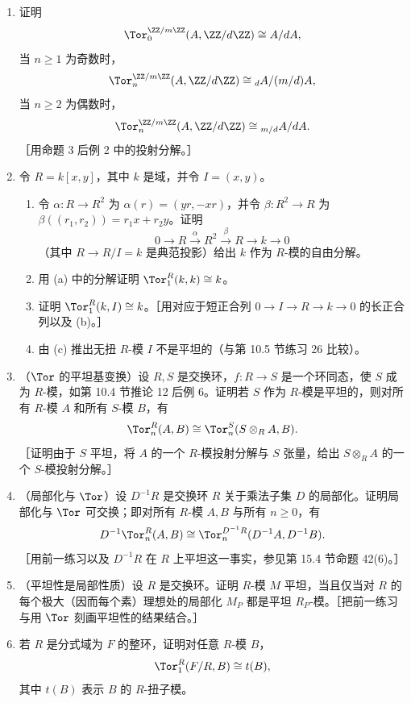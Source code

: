 \begin{enumerate}[label=\arabic*.]
  \item 证明
  \[
  \Tor_0^{\ZZ/m\ZZ}(A,\ZZ/d\ZZ)\cong A/dA,
  \]
  当 $n\geq1$ 为奇数时，
  \[
  \Tor_n^{\ZZ/m\ZZ}(A,\ZZ/d\ZZ)\cong {}_dA/(m/d)A,
  \]
  当 $n\geq2$ 为偶数时，
  \[
  \Tor_n^{\ZZ/m\ZZ}(A,\ZZ/d\ZZ)\cong {}_{m/d}A/dA.
  \]
  ［用命题 3 后例 2 中的投射分解。］

  \item 令 $R=k[x,y]$，其中 $k$ 是域，并令 $I=(x,y)$。
  \begin{enumerate}[label=(\alph*)]
    \item 令 $\alpha:R\to R^2$ 为 $\alpha(r)=(yr,-xr)$，并令 $\beta:R^2\to R$ 为 $\beta((r_1,r_2))=r_1x+r_2y$。证明
    \[
      0\to R\xrightarrow{\alpha}R^2\xrightarrow{\beta}R\to k\to0
    \]
    （其中 $R\to R/I=k$ 是典范投影）给出 $k$ 作为 $R$-模的自由分解。
    \item 用 (a) 中的分解证明 $\Tor_1^R(k,k)\cong k$。
    \item 证明 $\Tor_1^R(k,I)\cong k$。［用对应于短正合列 $0\to I\to R\to k\to0$ 的长正合列以及 (b)。］
    \item 由 (c) 推出无扭 $R$-模 $I$ 不是平坦的（与第 10.5 节练习 26 比较）。
  \end{enumerate}

  \item （$\Tor$ 的平坦基变换）设 $R,S$ 是交换环，$f:R\to S$ 是一个环同态，使 $S$ 成为 $R$-模，如第 10.4 节推论 12 后例 6。证明若 $S$ 作为 $R$-模是平坦的，则对所有 $R$-模 $A$ 和所有 $S$-模 $B$，有
  \[
    \Tor_n^R(A,B)\cong\Tor_n^S(S\otimes_R A,B).
  \]
  ［证明由于 $S$ 平坦，将 $A$ 的一个 $R$-模投射分解与 $S$ 张量，给出 $S\otimes_R A$ 的一个 $S$-模投射分解。］

  \item （局部化与 $\Tor$）设 $D^{-1}R$ 是交换环 $R$ 关于乘法子集 $D$ 的局部化。证明局部化与 $\Tor$ 可交换；即对所有 $R$-模 $A,B$ 与所有 $n\geq0$，有
  \[
    D^{-1}\Tor_n^R(A,B)\cong\Tor_n^{D^{-1}R}(D^{-1}A,D^{-1}B).
  \]
  ［用前一练习以及 $D^{-1}R$ 在 $R$ 上平坦这一事实，参见第 15.4 节命题 42(6)。］

  \item （平坦性是局部性质）设 $R$ 是交换环。证明 $R$-模 $M$ 平坦，当且仅当对 $R$ 的每个极大（因而每个素）理想处的局部化 $M_P$ 都是平坦 $R_P$-模。［把前一练习与用 $\Tor$ 刻画平坦性的结果结合。］

  \item 若 $R$ 是分式域为 $F$ 的整环，证明对任意 $R$-模 $B$，
  \[
    \Tor_1^R(F/R,B)\cong t(B),
  \]
  其中 $t(B)$ 表示 $B$ 的 $R$-扭子模。
\end{enumerate}

